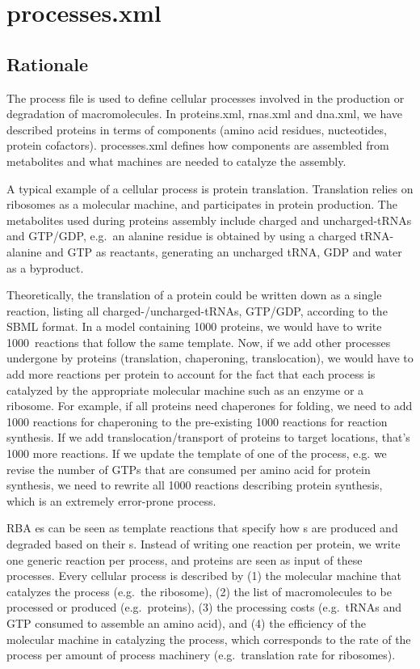 
\section{processes.xml}

\subsection{Rationale}

The process file is used to define cellular processes involved in
the production or degradation of macromolecules.
In proteins.xml, rnas.xml and dna.xml, we have described proteins in terms of
components (amino acid residues, nucteotides, protein cofactors).
processes.xml defines how components are assembled from metabolites and
what machines are needed to catalyze the assembly.

A typical example of a cellular process is protein translation.
Translation relies on ribosomes as a molecular machine,
and participates in protein production.
The metabolites used during proteins assembly include
charged and uncharged-tRNAs and GTP/GDP,
e.g.\ an alanine residue is obtained by using a charged tRNA-alanine and GTP as
reactants, generating an uncharged tRNA, GDP and water as a byproduct.

Theoretically, the translation of a protein could be written down as a single reaction,
listing all charged-/uncharged-tRNAs, GTP/GDP, according to the SBML format.
In a model containing 1000 proteins, we would have to write 1000 reactions
that follow the same template.
Now, if we add other processes undergone by proteins
(translation, chaperoning, translocation),
we would have to add more reactions per protein to account for the fact that each
process is catalyzed by the appropriate molecular machine such as an enzyme or a ribosome.
For example, if all proteins need chaperones for folding,
we need to add 1000 reactions for chaperoning to the pre-existing
1000 reactions for reaction synthesis.
If we add translocation/transport of proteins to target locations,
that's 1000 more reactions.
If we update the template of one of the process,
e.g. we revise the number of GTPs that are consumed per amino acid for protein synthesis,
we need to rewrite all 1000 reactions describing protein synthesis,
which is an extremely error-prone process.

RBA \process{}es can be seen as template reactions that specify how
\macromolecule{}s are produced and degraded based on their \component{}s.
Instead of writing one reaction per protein,
we write one generic reaction per process,
and proteins are seen as input of these processes.
Every cellular process is described by
(1) the molecular machine that catalyzes the process (e.g.\ the ribosome),
(2) the list of macromolecules to be processed or produced (e.g.\ proteins),
(3) the processing costs (e.g.\ tRNAs and GTP consumed to assemble an amino acid), and
(4) the efficiency of the molecular machine in catalyzing the process,
which corresponds to the rate of the process per amount of process machinery
(e.g.\ translation rate for ribosomes).

